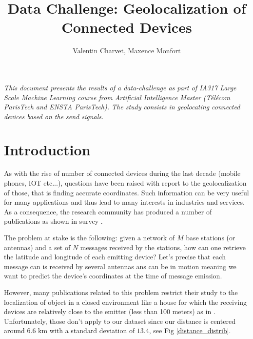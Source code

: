 \documentclass[twocolumn,2pt]{article}
\title{Data Challenge: Geolocalization of Connected Devices}
\author{Valentin Charvet, Maxence Monfort}
\begin{document}
	\maketitle
	\hspace{2cm}
	
	\textit{This document presents the results of a data-challenge as part of IA317 Large Scale Machine Learning course from Artificial Intelligence Master (Télécom ParisTech and ENSTA ParisTech). The study consists in geolocating connected devices based on the send signals.}
		
	
	\section{Introduction}
	As with the rise of number of connected devices during the last decade (mobile phones, IOT etc...), questions have been raised with report to the geolocalization of those, that is finding accurate coordinates. Such information can be very useful for many applications and thus lead to many interests in industries and services. As a consequence, the research community has produced a number of publications as shown in survey \cite{roxin:hal-00470120}.
	
	The problem at stake is the following: given a network of $M$ base stations (or antennas) and a set of $N$ messages received by the stations, how can one retrieve the latitude and longitude of each emitting device? Let's precise that each message can is received by several antennas ans can be in motion meaning we want to predict the device's coordinates at the time of message emission.
	
	However, many publications related to this problem restrict their study to the localization of object in a closed environment like a house for which the receiving devices are relatively close to the emitter (less than 100 meters) as in \cite{he2013testbed}. Unfortunately, those don't apply to our dataset since our distance is centered around $6.6$ km with a standard deviation of $13.4$, see  Fig \ref{distance_distrib}.
	
\end{document}

